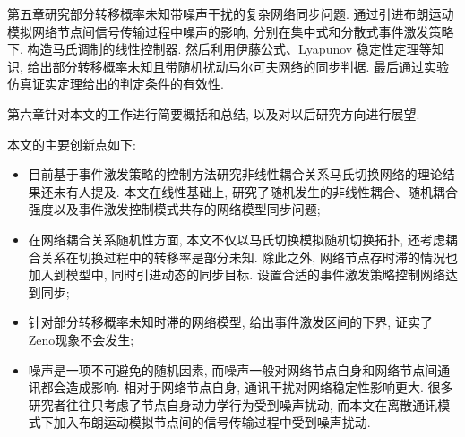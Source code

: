 
第五章研究部分转移概率未知带噪声干扰的复杂网络同步问题. 通过引进布朗运动模拟网络节点间信号传输过程中噪声的影响, 分别在集中式和分散式事件激发策略下, 构造马氏调制的线性控制器. 然后利用伊藤公式、Lyapunov 稳定性定理等知识, 给出部分转移概率未知且带随机扰动马尔可夫网络的同步判据. 最后通过实验仿真证实定理给出的判定条件的有效性.


第六章针对本文的工作进行简要概括和总结, 以及对以后研究方向进行展望.

本文的主要创新点如下:
\begin{itemize}\setlength{\itemsep}{0cm}
  \item
  目前基于事件激发策略的控制方法研究非线性耦合关系马氏切换网络的理论结果还未有人提及. 本文在线性基础上, 研究了随机发生的非线性耦合、随机耦合强度以及事件激发控制模式共存的网络模型同步问题;
  \item 在网络耦合关系随机性方面, 本文不仅以马氏切换模拟随机切换拓扑, 还考虑耦合关系在切换过程中的转移率是部分未知. 除此之外, 网络节点存时滞的情况也加入到模型中, 同时引进动态的同步目标. 设置合适的事件激发策略控制网络达到同步;
  \item 针对部分转移概率未知时滞的网络模型, 给出事件激发区间的下界, 证实了Zeno现象不会发生;
  \item 噪声是一项不可避免的随机因素, 而噪声一般对网络节点自身和网络节点间通讯都会造成影响. 相对于网络节点自身, 通讯干扰对网络稳定性影响更大. 很多研究者往往只考虑了节点自身动力学行为受到噪声扰动, 而本文在离散通讯模式下加入布朗运动模拟节点间的信号传输过程中受到噪声扰动.
\end{itemize}


